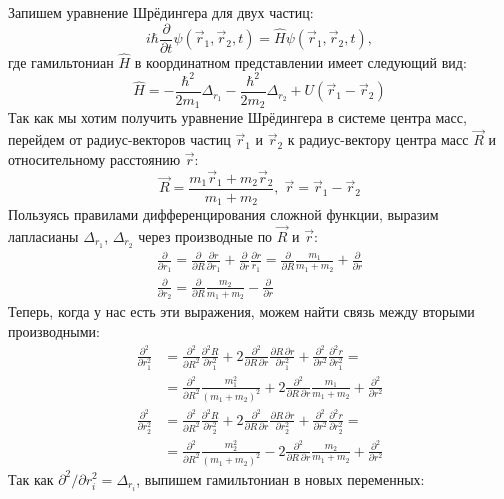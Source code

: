 Запишем уравнение Шрёдингера для двух частиц:
\[
i\hbar\frac{\partial}{\partial t}\psi(\Vec{r}_1, \Vec{r}_2, t) = \hat{H}\psi(\Vec{r}_1, \Vec{r}_2, t),
\]
где гамильтониан $\hat{H}$ в координатном представлении имеет следующий вид:
\[
\hat{H} = -\frac{\hbar^2}{2m_1}\Delta_{r_1} -\frac{\hbar^2}{2m_2}\Delta_{r_2} + U(\Vec{r}_1 - \Vec{r}_2)
\]
Так как мы хотим получить уравнение Шрёдингера в системе центра масс, перейдем от радиус-векторов частиц $\Vec{r}_1$ и $\Vec{r}_2$ к радиус-вектору центра масс $\Vec{R}$ и относительному расстоянию $\Vec{r}$:
\[
\Vec{R} = \frac{m_1\Vec{r}_1 + m_2\Vec{r}_2}{m_1 + m_2}, \; \Vec{r} = \Vec{r}_1 - \Vec{r}_2
\]
Пользуясь правилами дифференцирования сложной функции, выразим лапласианы $\Delta_{r_1}$, $\Delta_{r_2}$ через производные по $\Vec{R}$ и $\Vec{r}$:
\begin{gather*}
\frac{\partial}{\partial r_1} = \frac{\partial}{\partial R}\frac{\partial r}{\partial r_1} + \frac{\partial}{\partial r}\frac{\partial r}{r_1} = \frac{\partial}{\partial R}\frac{m_1}{m_1 + m_2} + \frac{\partial}{\partial r}\\
\frac{\partial}{\partial r_2} = \frac{\partial}{\partial R}\frac{m_2}{m_1 + m_2} - \frac{\partial}{\partial r}
\end{gather*}
Теперь, когда у нас есть эти выражения, можем найти связь между вторыми производными:
\begin{align*}
\frac{\partial^2}{\partial r_1^2} &= \frac{\partial^2}{\partial R^2} \frac{\partial^2 R}{\partial r_1^2} + 2\frac{\partial^2}{\partial R\,\partial r}\frac{\partial R\,\partial r}{\partial r_1^2} + \frac{\partial^2}{\partial r^2} \frac{\partial^2 r}{\partial r_1^2} = \\
&= \frac{\partial^2}{\partial R^2} \frac{m_1^2}{(m_1 + m_2)^2} + 2\frac{\partial^2}{\partial R\,\partial r}\frac{m_1}{m_1 + m_2} +  \frac{\partial^2}{\partial r^2}
\end{align*}
\begin{align*}
    \frac{\partial^2}{\partial r_2^2} &= \frac{\partial^2}{\partial R^2} \frac{\partial^2 R}{\partial r_2^2} + 2\frac{\partial^2}{\partial R\,\partial r}\frac{\partial R\,\partial r}{\partial r_2^2} + \frac{\partial^2}{\partial r^2} \frac{\partial^2 r}{\partial r_2^2} = \\
    & = \frac{\partial^2}{\partial R^2} \frac{m_2^2}{(m_1 + m_2)^2} - 2\frac{\partial^2} {\partial R\,\partial r} \frac{m_2}{m_1 + m_2} + \frac{\partial^2}{\partial r^2}
\end{align*}
Так как $\partial^2/\partial r_i^2 = \Delta_{r_i}$, выпишем гамильтониан в новых переменных:
